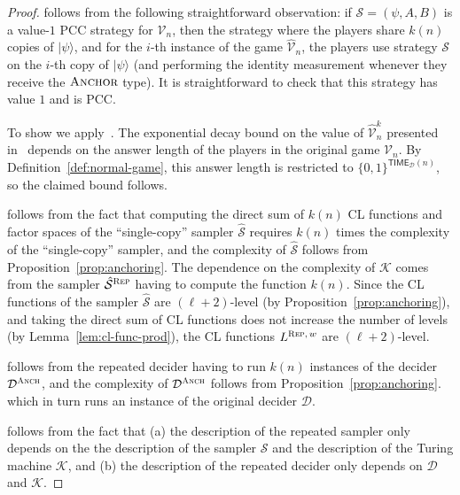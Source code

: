 \documentclass[11pt]{article}
\theoremstyle{definition}
\newcommand{\ket}[1]{|#1\rangle}
\newcommand{\sampler}{\mathcal{S}}
\newcommand{\decider}{\mathcal{D}}
\newcommand{\verifier}{\mathcal{V}}
\newcommand{\strategy}{\mathscr{S}}
\newcommand{\gamestyle}[1]{\ensuremath{\textsc{#1}}\xspace}
\newcommand{\typestyle}[1]{\ensuremath{\textsc{#1}}\xspace}
\newcommand{\Anchor}{\typestyle{Anchor}}
\renewcommand{\cal}[1]{\mathcal{#1}}
\newcommand{\TIME}{\mathsf{TIME}}
\newcommand{\anch}{\gamestyle{Anch}}
\newcommand{\rep}{\gamestyle{Rep}}
\begin{document}
\begin{proof}
	 follows from the following straightforward
  observation: if $\strategy = (\psi,A,B)$ is a value-$1$ PCC strategy for
  $\verifier_n$, then the strategy where the players share $k(n)$ copies of
  $\ket{\psi}$, and for the $i$-th instance of the game $\hat{\verifier}_n$, the
  players use strategy $\strategy$ on the $i$-th copy of $\ket{\psi}$ (and
  performing the identity measurement whenever they receive the $\Anchor$ type).
  It is straightforward to check that this strategy has value $1$ and is PCC.

	To show  we apply~\cite[Theorem
  17]{bavarian2017hardness}.
  The exponential decay bound on the value of $\hat{\verifier}^k_n$ presented
  in~\cite{bavarian2017hardness} depends on the answer length of the players in
  the original game $\verifier_n$.
  By Definition~\ref{def:normal-game}, this answer length is restricted to
  $\{0,1\}^{\TIME_\decider(n)}$, so the claimed bound follows.
	
	 follows from the fact that computing the
  direct sum of $k(n)$ CL functions and factor spaces of the ``single-copy''
  sampler $\hat{\sampler}$ requires $k(n)$ times the complexity of the
  ``single-copy'' sampler, and the complexity of $\hat{\sampler}$ follows from
  Proposition~\ref{prop:anchoring}.
  The dependence on the complexity of $\cal{K}$ comes from the sampler
  $\hat{\sampler}^\rep$ having to compute the function $k(n)$.
  Since the CL functions of the sampler $\hat{\sampler}$ are $(\ell+2)$-level
  (by Proposition~\ref{prop:anchoring}), and taking the direct sum of CL
  functions does not increase the number of levels (by
  Lemma~\ref{lem:cl-func-prod}), the CL functions $L^{\rep,\, w}$ are
  $(\ell+2)$-level.
	
	 follows from the repeated decider having to
  run $k(n)$ instances of the decider $\decider^\anch$, and the complexity of
  $\decider^\anch$ follows from
  Proposition~\ref{prop:anchoring}.
  which in turn runs an instance of the original decider $\decider$.
	
   follows from the fact that (a) the description of
  the repeated sampler only depends on the the description of the sampler
  $\sampler$ and the description of the Turing machine $\cal{K}$, and (b) the
  description of the repeated decider only depends on $\decider$ and $\cal{K}$.
\end{proof}
\end{document}
